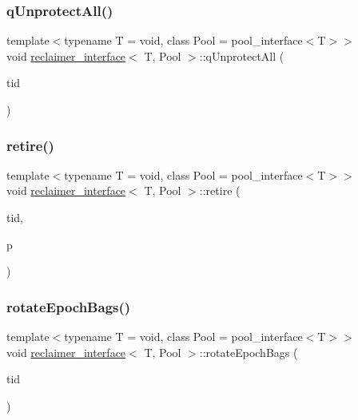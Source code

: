 \subsubsection{\texorpdfstring{q\+Unprotect\+All()}{qUnprotectAll()}}
{\footnotesize\ttfamily template$<$typename T  = void, class Pool  = pool\+\_\+interface$<$\+T$>$$>$ \\
void \hyperlink{classreclaimer__interface}{reclaimer\+\_\+interface}$<$ T, Pool $>$\+::q\+Unprotect\+All (\begin{DoxyParamCaption}\item[{const int}]{tid }\end{DoxyParamCaption})\hspace{0.3cm}{\ttfamily [inline]}}

\mbox{\label{classreclaimer__interface_a0ef47251c6a7fbd543354b88db8aa309}} 
\subsubsection{\texorpdfstring{retire()}{retire()}}
{\footnotesize\ttfamily template$<$typename T  = void, class Pool  = pool\+\_\+interface$<$\+T$>$$>$ \\
void \hyperlink{classreclaimer__interface}{reclaimer\+\_\+interface}$<$ T, Pool $>$\+::retire (\begin{DoxyParamCaption}\item[{const int}]{tid,  }\item[{T $\ast$}]{p }\end{DoxyParamCaption})\hspace{0.3cm}{\ttfamily [inline]}}

\mbox{\label{classreclaimer__interface_aa3a2771a4002d59cf81ef86921d499ca}} 
\subsubsection{\texorpdfstring{rotate\+Epoch\+Bags()}{rotateEpochBags()}}
{\footnotesize\ttfamily template$<$typename T  = void, class Pool  = pool\+\_\+interface$<$\+T$>$$>$ \\
void \hyperlink{classreclaimer__interface}{reclaimer\+\_\+interface}$<$ T, Pool $>$\+::rotate\+Epoch\+Bags (\begin{DoxyParamCaption}\item[{const int}]{tid }\end{DoxyParamCaption})\hspace{0.3cm}{\ttfamily [inline]}}

